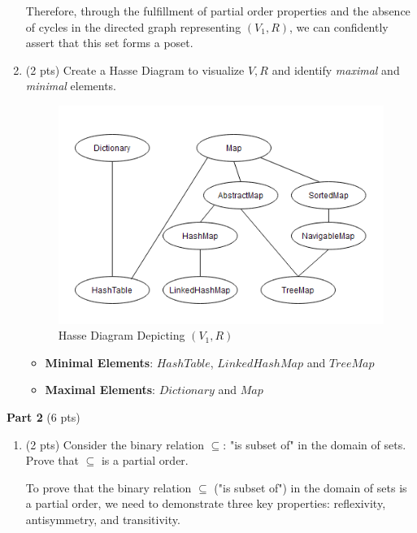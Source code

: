 \documentclass[12pt]{article}
\begin{document}
\begin{spacing}{1.5}
\begin{enumerate}
            Therefore, through the fulfillment of partial order properties and the absence of cycles in the directed graph representing $(V_1, R)$, we can confidently assert that this set forms a poset.       
		              
		\item (2 pts) Create a Hasse Diagram to visualize $V, R$ and identify \textit{maximal} and \textit{minimal} elements.

        \begin{figure}[htp]
    		\centering
    		\includegraphics{HasseDiagram_6_3_1.png}
    		\caption{Hasse Diagram Depicting $(V_1,R)$}
    		\label{fig:figure}
    	\end{figure}
     
        \begin{itemize}
            \item \textbf{Minimal Elements}: $HashTable$, $LinkedHashMap$ and $TreeMap$
            \item \textbf{Maximal Elements}: $Dictionary$ and $Map$
        \end{itemize}
		      
	\end{enumerate}
	
	\noindent \textbf{Part 2} (6 pts)
	
	\begin{enumerate}
		\item (2 pts) Consider the binary relation $\subseteq$: "is subset of" in the domain of sets. Prove that $\subseteq$ is a partial order.

            To prove that the binary relation $\subseteq$ ("is subset of") in the domain of sets is a partial order, we need to demonstrate three key properties: reflexivity, antisymmetry, and transitivity.


\end{enumerate}
\end{spacing}
\end{document}
